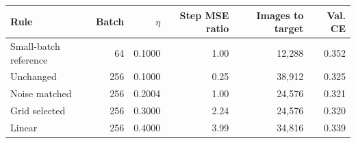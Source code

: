 \begin{tabular}{@{}lrrrrr@{}}
\toprule
Rule & Batch & $\eta$ & Step MSE ratio & Images to target & Val. CE \\
\midrule
Small-batch reference & 64 & 0.1000 & 1.00 & 12,288 & 0.352 \\
Unchanged & 256 & 0.1000 & 0.25 & 38,912 & 0.325 \\
Noise matched & 256 & 0.2004 & 1.00 & 24,576 & 0.321 \\
Grid selected & 256 & 0.3000 & 2.24 & 24,576 & 0.320 \\
Linear & 256 & 0.4000 & 3.99 & 34,816 & 0.339 \\
\bottomrule
\end{tabular}
